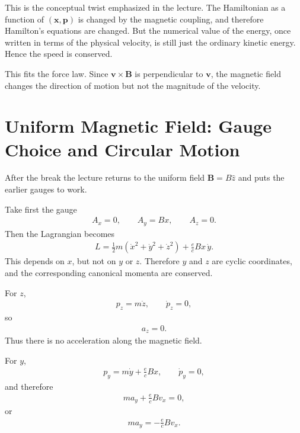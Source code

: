This is the conceptual twist emphasized in the lecture. The Hamiltonian as a function of \((\mathbf x,\mathbf p)\) is changed by the magnetic coupling, and therefore Hamilton's equations are changed. But the numerical value of the energy, once written in terms of the physical velocity, is still just the ordinary kinetic energy. Hence the speed is conserved.

This fits the force law. Since \(\mathbf v\times \mathbf B\) is perpendicular to \(\mathbf v\), the magnetic field changes the direction of motion but not the magnitude of the velocity.

\section{Uniform Magnetic Field: Gauge Choice and Circular Motion}

After the break the lecture returns to the uniform field \(\mathbf B=B\hat z\) and puts the earlier gauges to work.

Take first the gauge
\begin{align}
A_x=0,\qquad A_y=Bx,\qquad A_z=0.
\end{align}
Then the Lagrangian becomes
\begin{align}
L
=
\frac{1}{2}m\left(\dot x^2+\dot y^2+\dot z^2\right)
+
\frac{e}{c}Bx\,\dot y.
\end{align}
This depends on \(x\), but not on \(y\) or \(z\). Therefore \(y\) and \(z\) are cyclic coordinates, and the corresponding canonical momenta are conserved.

For \(z\),
\begin{align}
p_z=m\dot z,
\qquad
\dot p_z=0,
\end{align}
so
\begin{align}
a_z=0.
\end{align}
Thus there is no acceleration along the magnetic field.

For \(y\),
\begin{align}
p_y=m\dot y+\frac{e}{c}Bx,
\qquad
\dot p_y=0,
\end{align}
and therefore
\begin{align}
m a_y+\frac{e}{c}B v_x=0,
\end{align}
or
\begin{align}
m a_y=-\frac{e}{c}B v_x.
\end{align}

